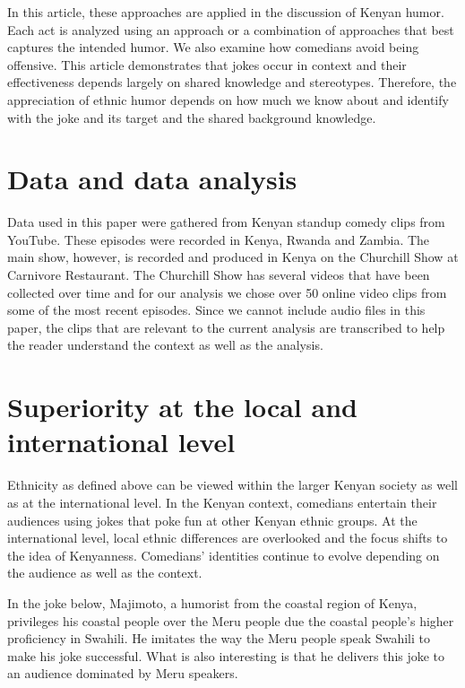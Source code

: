 \documentclass[output=paper]{langsci/langscibook}
\begin{document}
   In this article, these approaches are applied in the discussion of Kenyan humor. Each act is analyzed using an approach or a combination of approaches that best captures the intended humor. We also examine how comedians avoid being offensive. This article demonstrates that jokes occur in context and their effectiveness depends largely on shared knowledge and stereotypes. Therefore, the appreciation of ethnic humor depends on how much we know about and identify with the joke and its target and the shared background knowledge. 

\section{Data and data analysis}

   Data used in this paper were gathered from Kenyan standup comedy clips from YouTube. These episodes were recorded in Kenya, Rwanda and Zambia. The main show, however, is recorded and produced in Kenya on the Churchill Show at Carnivore Restaurant. The Churchill Show has several videos that have been collected over time and for our analysis we chose over 50 online video clips from some of the most recent episodes. Since we cannot include audio files in this paper, the clips that are relevant to the current analysis are transcribed to help the reader understand the context as well as the analysis. 

\section{Superiority at the local and international level}

  Ethnicity as defined above can be viewed within the larger Kenyan society as well as at the international level. In the Kenyan context, comedians entertain their audiences using jokes that poke fun at other Kenyan ethnic groups. At the international level, local ethnic differences are overlooked and the focus shifts to the idea of Kenyanness. Comedians’ identities continue to evolve depending on the audience as well as the context.

   In the joke below, Majimoto, a humorist from the coastal region of Kenya, privileges his coastal people over the Meru people due the coastal people’s higher proficiency in Swahili. He imitates the way the Meru people speak Swahili to make his joke successful. What is also interesting is that he delivers this joke to an audience dominated by Meru speakers.
 
\end{document}
